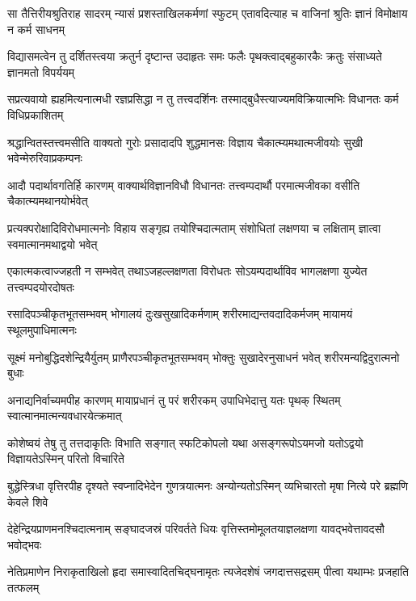 \fourlineindentedshloka
{सा तैत्तिरीयश्रुतिराह सादरम्}
{न्यासं प्रशस्ताखिलकर्मणां स्फुटम्}
{एतावदित्याह च वाजिनां श्रुतिः}
{ज्ञानं विमोक्षाय न कर्म साधनम्} %

\fourlineindentedshloka
{विद्यासमत्वेन तु दर्शितस्त्वया}
{क्रतुर्न दृष्टान्त उदाहृतः समः}
{फलैः पृथक्त्वाद्बहुकारकैः क्रतुः}
{संसाध्यते ज्ञानमतो विपर्ययम्} %

\fourlineindentedshloka
{सप्रत्यवायो ह्यहमित्यनात्मधी\-}
{रज्ञप्रसिद्धा न तु तत्त्वदर्शिनः}
{तस्माद्बुधैस्त्याज्यमविक्रियात्मभिः}
{विधानतः कर्म विधिप्रकाशितम्} %

\fourlineindentedshloka
{श्रद्धान्वितस्तत्त्वमसीति वाक्यतो}
{गुरोः प्रसादादपि शुद्धमानसः}
{विज्ञाय चैकात्म्यमथात्मजीवयोः}
{सुखी भवेन्मेरुरिवाप्रकम्पनः} %

\fourlineindentedshloka
{आदौ पदार्थावगतिर्हि कारणम्}
{वाक्यार्थविज्ञानविधौ विधानतः}
{तत्त्वम्पदार्थौ परमात्मजीवका\-}
{वसीति चैकात्म्यमथानयोर्भवेत्} %

\fourlineindentedshloka
{प्रत्यक्परोक्षादिविरोधमात्मनोः}
{विहाय सङ्गृह्य तयोश्चिदात्मताम्}
{संशोधितां लक्षणया च लक्षिताम्}
{ज्ञात्वा स्वमात्मानमथाद्वयो भवेत्} %

\fourlineindentedshloka
{एकात्मकत्वाज्जहती न सम्भवेत्}
{तथाऽजहल्लक्षणता विरोधतः}
{सोऽयम्पदार्थाविव भागलक्षणा}
{युज्येत तत्त्वम्पदयोरदोषतः} %

\fourlineindentedshloka
{रसादिपञ्चीकृतभूतसम्भवम्}
{भोगालयं दुःखसुखादिकर्मणाम्}
{शरीरमाद्यन्तवदादिकर्मजम्}
{मायामयं स्थूलमुपाधिमात्मनः} %

\fourlineindentedshloka
{सूक्ष्मं मनोबुद्धिदशेन्द्रियैर्युतम्}
{प्राणैरपञ्चीकृतभूतसम्भवम्}
{भोक्तुः सुखादेरनुसाधनं भवेत्}
{शरीरमन्यद्विदुरात्मनो बुधाः} %

\fourlineindentedshloka
{अनाद्यनिर्वाच्यमपीह कारणम्}
{मायाप्रधानं तु परं शरीरकम्}
{उपाधिभेदात्तु यतः पृथक् स्थितम्}
{स्वात्मानमात्मन्यवधारयेत्क्रमात्} %

\fourlineindentedshloka
{कोशेष्वयं तेषु तु तत्तदाकृतिः}
{विभाति सङ्गात् स्फटिकोपलो यथा}
{असङ्गरूपोऽयमजो यतोऽद्वयो}
{विज्ञायतेऽस्मिन् परितो विचारिते} %

\fourlineindentedshloka
{बुद्धेस्त्रिधा वृत्तिरपीह दृश्यते}
{स्वप्नादिभेदेन गुणत्रयात्मनः}
{अन्योन्यतोऽस्मिन् व्यभिचारतो मृषा}
{नित्ये परे ब्रह्मणि केवले शिवे} %

\fourlineindentedshloka
{देहेन्द्रियप्राणमनश्चिदात्मनाम्}
{सङ्घादजस्रं परिवर्तते धियः}
{वृत्तिस्तमोमूलतयाज्ञलक्षणा}
{यावद्भवेत्तावदसौ भवोद्भवः} %

\fourlineindentedshloka
{नेतिप्रमाणेन निराकृताखिलो}
{हृदा समास्वादितचिद्घनामृतः}
{त्यजेदशेषं जगदात्तसद्रसम्}
{पीत्वा यथाम्भः प्रजहाति तत्फलम्} %

